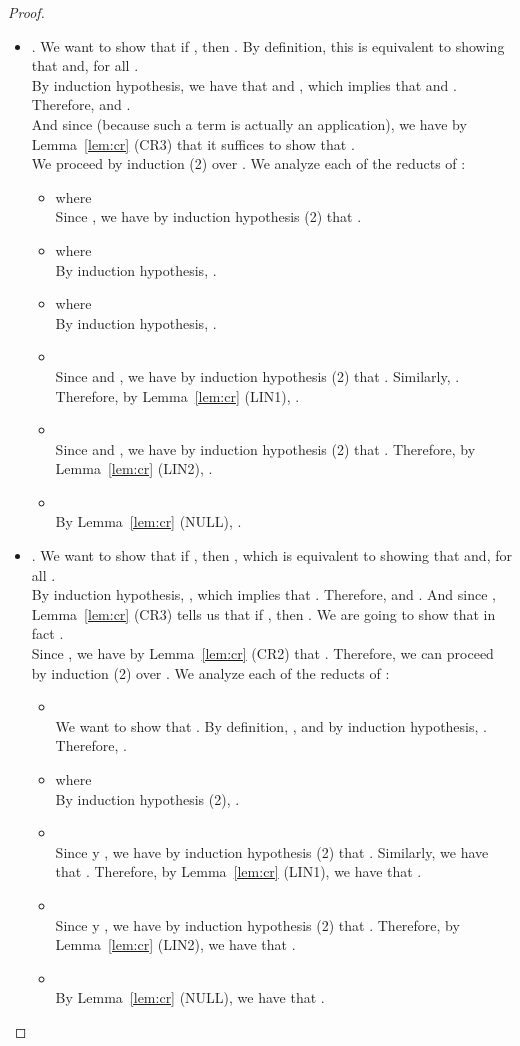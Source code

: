 \documentclass[preprint]{elsarticle}
\begin{document}
\begin{proof}
\begin{itemize}
  \item .
    We want to show that if , then . By definition, this is equivalent to showing that  and, for all .
    \\ By induction hypothesis, we have that  and , which implies that  and . Therefore,  and .
    \\ And since  (because such a term is actually an application), we have by Lemma~\ref{lem:cr} (CR3) that it suffices to show that .
    \\ We proceed by induction (2) over . We analyze each of the reducts of :
    \begin{itemize}
    \item  where 
      \\ Since , we have by induction hypothesis (2) that .
    \item  where 
      \\ By induction hypothesis, .
    \item  where 
      \\ By induction hypothesis, .
    \item 
      \\ Since  and , we have by induction hypothesis (2) that . Similarly, . Therefore, by Lemma~\ref{lem:cr} (LIN1), .
    \item 
      \\ Since  and , we have by induction hypothesis (2) that . Therefore, by Lemma~\ref{lem:cr} (LIN2), .
    \item 
      \\ By Lemma~\ref{lem:cr} (NULL), .
    \end{itemize}

  \item .
    We want to show that if , then , which is equivalent to showing that  and, for all .
    \\ By induction hypothesis, , which implies that . Therefore,  and . And since , Lemma~\ref{lem:cr} (CR3) tells us that if , then .
    We are going to show that in fact .
    \\ Since , we have by Lemma~\ref{lem:cr} (CR2) that . Therefore, we can proceed by induction (2) over . We analyze each of the reducts of :
    \begin{itemize}
    \item 
      \\ We want to show that . By definition, , and by induction hypothesis, . Therefore, .
    \item  where 
      \\ By induction hypothesis (2), .
    \item 
      \\ Since  y , we have by induction hypothesis (2) that . Similarly, we have that . Therefore, by Lemma~\ref{lem:cr} (LIN1), we have that .
    \item 
      \\ Since  y , we have by induction hypothesis (2) that . Therefore, by Lemma~\ref{lem:cr} (LIN2), we have that .
    \item 
      \\ By Lemma~\ref{lem:cr} (NULL), we have that .
    \end{itemize}


\end{itemize}
\end{proof}
\end{document}
